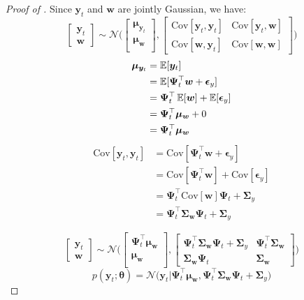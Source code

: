 \documentclass{article}
\begin{document}
\begin{proof}[Proof of ]
Since $\bm{y}_t$ and $\bm{w}$ are jointly Gaussian, we have:
\begin{equation}
  \begin{bmatrix}
    \bm{y}_t \\
    \bm{w}
  \end{bmatrix} \sim \mathcal{N}\Bigg(
  \begin{bmatrix}
    \bm{\mu}_{\bm{y}_{t}} \\
    \bm{\mu_w} \\
  \end{bmatrix},
  \begin{bmatrix}
    \mathrm{Cov}[\bm{y}_t, \bm{y}_t] & \mathrm{Cov}[\bm{y}_t, \bm{w}]  \\
    \mathrm{Cov}[\bm{w}, \bm{y}_t] & \mathrm{Cov}[\bm{w}, \bm{w}]
  \end{bmatrix}
  \Bigg)
\end{equation}
\begin{align}
  \bm{\mu}_{\bm{y}_{t}} &= \operatorname{\mathbb{E}}[\bm{y}_{t}]\\
                        &= \operatorname{\mathbb{E}}[\bm{\Psi}^\top_t \bm{w} + \bm{\epsilon}_y]\\
                        &= \bm{\Psi}^\top_t \operatorname{\mathbb{E}}[\bm{w}] + \operatorname{\mathbb{E}}[\bm{\epsilon}_y]\\
                        &= \bm{\Psi}^\top_t \bm{\mu_w} + 0\\
                        &= \bm{\Psi}^\top_t \bm{\mu_w}
\end{align}
\begin{align}
  \mathrm{Cov}[\bm{y}_t, \bm{y}_t] &= \mathrm{Cov}[\bm{\Psi}^\top_t \bm{w} + \bm{\epsilon}_y]\\
  &= \mathrm{Cov}[\bm{\Psi}^\top_t \bm{w}] + \mathrm{Cov}[\bm{\epsilon}_y]\\
  &= \bm{\Psi}^\top_t\mathrm{Cov}[\bm{w}]\bm{\Psi}_t + \bm{\Sigma}_{y}\\
    &= \bm{\Psi}^\top_t\bm{\Sigma_{w}}\bm{\Psi}_t + \bm{\Sigma}_{y}\label{eq:cov_y_y}
\end{align}

\begin{equation}
  \begin{bmatrix}
    \bm{y}_t \\
    \bm{w}
  \end{bmatrix} \sim \mathcal{N}\Bigg(
  \begin{bmatrix}
    \bm{\Psi}^\top_t \bm{\mu_w} \\
    \bm{\mu_w} \\
  \end{bmatrix},
  \begin{bmatrix}
    \bm{\Psi}^\top_t \bm{\Sigma_w} \bm{\Psi}_t + \bm{\Sigma}_y & \bm{\Psi}^\top_t \bm{\Sigma_w}  \\
    \bm{\Sigma_w} \bm{\Psi}_t & \bm{\Sigma_w}
  \end{bmatrix}
  \Bigg)
\end{equation}
\begin{equation}
p(\bm{y}_t; \bm{\theta}) = \mathcal{N}\Big( \bm{y}_t | \bm{\Psi}^\top_t \bm{\mu_w}, \bm{\Psi}^\top_t \bm{\Sigma_w} \bm{\Psi}_t + \bm{\Sigma}_y \Big)
\end{equation}


\end{proof}
\end{document}
